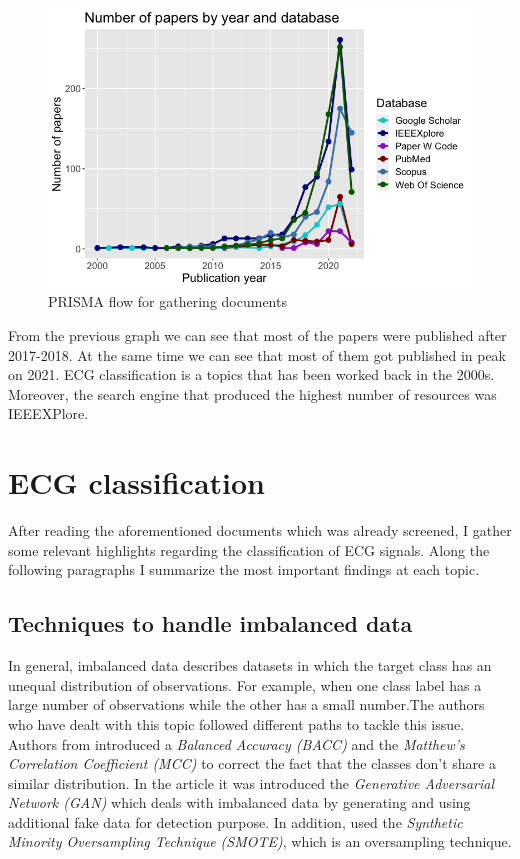  \begin{figure}[H]
\centering
\includegraphics[scale=0.54]{img/timeline_papers.png}
\caption{PRISMA flow for gathering documents}
\label{fig:timeline_papers}
\end{figure}


From the previous graph we can see that most of the papers were published after 2017-2018. At the same time we can see that most of them got published in peak on 2021. ECG classification is a topics that has been worked back in the 2000s. Moreover, the search engine that produced the highest number of resources was IEEEXPlore. 


\section{ECG classification} \label{3state_art_ECG}

After reading the aforementioned documents which was already screened, I gather some relevant highlights regarding the classification of ECG signals. Along the following paragraphs I summarize the most important findings at each topic.

\subsection{Techniques to handle imbalanced data}

In general, imbalanced data describes datasets in which the target class has an unequal distribution of observations. For example, when one class label has a large number of observations while the other has a small number.The authors who have dealt with this topic followed different paths to tackle this issue. Authors from \cite{imbalance_data1} introduced a \textit{Balanced Accuracy (BACC)} and the \textit{Matthew’s Correlation Coefficient (MCC)} to correct the fact that the classes don't share a similar distribution. In the article \cite{imbalance_data2} it was introduced the \textit{Generative Adversarial Network (GAN)} which deals with imbalanced data by generating and using additional fake data for detection purpose. In addition, \cite{imbalance_data3} used the \textit{Synthetic Minority Oversampling Technique (SMOTE)}, which is an oversampling technique. 

